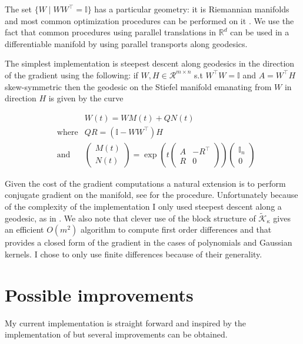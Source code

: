 \documentclass[a4paper,BCOR=5mm,oneside,openany]{scrreprt}
\begin{document}
The set $\{ W \mid W W^\intercal = \mathbb{I} \}$ has a particular geometry: it is Riemannian manifolds and most common optimization procedures can be performed on it \cite{Edelman1998}. We use the fact that common procedures using parallel translations in $\mathbb{R}^d$ can be used in a differentiable manifold by using parallel transports along geodesics.

The simplest implementation is steepest descent along geodesics in the direction of the gradient using the following: if $W, H \in \mathcal{R}^{m \times n}$ s.t $W^\intercal W = \mathbb{I}$ and $A = W^\intercal H$ skew-symmetric then the geodesic on the Stiefel manifold emanating from $W$ in direction $H$ is given by the curve

\begin{align*}
	& &W (t) = W M (t) + Q N (t) \\
	&\text{where} & QR = (\mathbb{I} - W W^\intercal) H \\
	&\text{and} &\begin{pmatrix}
		M(t) \\ N(t)
	\end{pmatrix} = \exp \left( t \begin{pmatrix}
		A & - R^\intercal \\
		R & 0
	\end{pmatrix} \right) \begin{pmatrix}
		\mathbb{I}_n \\ 0
	\end{pmatrix}
\end{align*}
						
Given the cost of the gradient computations a natural extension is to perform conjugate gradient on the manifold, see \cite{Edelman1998} for the procedure. Unfortunately because of the complexity of the implementation I only used steepest descent along a geodesic, as in \cite{Bach2002}. We also note that clever use of the block structure of $\tilde{\mathcal{K}}_\kappa$ gives an efficient $O(m^2)$ algorithm to compute first order differences and that \cite{Bach2002} provides a closed form of the gradient in the cases of polynomials and Gaussian kernels. I chose to only use finite differences because of their generality.

\section{Possible improvements}

My current implementation is straight forward and inspired by the implementation of \cite{Bach2002} but several improvements can be obtained.
\end{document}
